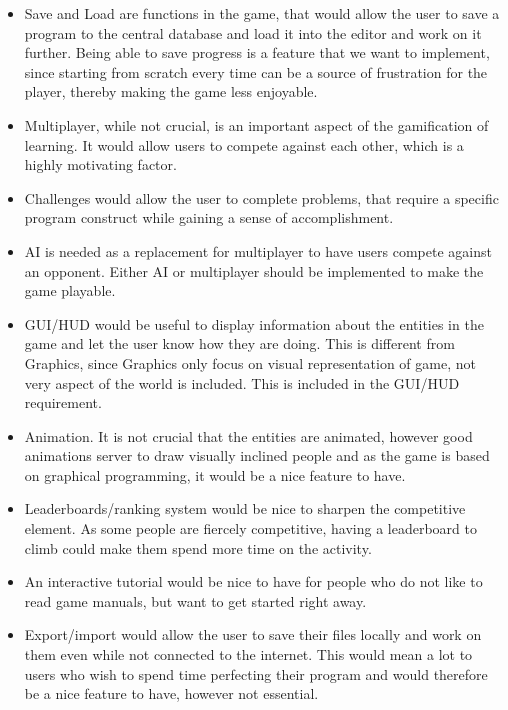 \begin{itemize}
\item Save and Load are functions in the game, that would allow the user to save a program to the central database and load it into the editor and work on it further. Being able to save progress is a feature that we want to implement, since starting from scratch every time can be a source of frustration for the player, thereby making the game less enjoyable.

\item Multiplayer, while not crucial, is an important aspect of the gamification of learning. It would allow users to compete against each other, which is a highly motivating factor.

\item Challenges would allow the user to complete problems, that require a specific program construct while gaining a sense of accomplishment.

\item AI is needed as a replacement for multiplayer to have users compete against an opponent. Either AI or multiplayer should be implemented to make the game playable.

\item GUI/HUD would be useful to display information about the entities in the game and let the user know how they are doing. This is different from Graphics, since Graphics only focus on visual representation of game, not very aspect of the world is included. This is included in the GUI/HUD requirement.
\end{itemize}

\begin{itemize}
\item Animation. It is not crucial that the entities are animated, however good animations server to draw visually inclined people and as the game is based on graphical programming, it would be a nice feature to have.

\item Leaderboards/ranking system would be nice to sharpen the competitive element. As some people are fiercely competitive, having a leaderboard to climb could make them spend more time on the activity.

\item An interactive tutorial would be nice to have for people who do not like to read game manuals, but want to get started right away.

\item Export/import would allow the user to save their files locally and work on them even while not connected to the internet. This would mean a lot to users who wish to spend time perfecting their program and would therefore be a nice feature to have, however not essential.
\end{itemize}